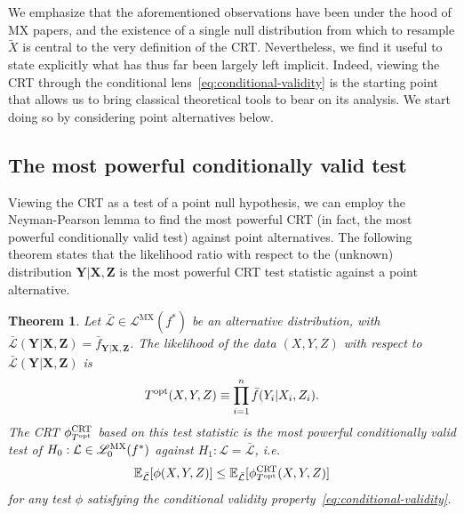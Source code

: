 \documentclass[12pt]{article}
\newtheorem{theorem}{Theorem}
\theoremstyle{definition}
\theoremstyle{remark}
\newcommand{\prx}{\bm X}
\newcommand{\srx}{X}
\newcommand{\prz}{\bm Z}
\newcommand{\srz}{Z}
\newcommand{\srxk}{\widetilde X}
\newcommand{\pry}{{\bm Y}}
\newcommand{\sry}{Y}
\def\CRT{\textnormal{CRT}}
\begin{document}
We emphasize that the aforementioned observations have been under the hood of MX papers, and the existence of a single null distribution from which to resample $\srxk$ is central to the very definition of the CRT. Nevertheless, we find it useful to state explicitly what has thus far been largely left implicit. Indeed, viewing the CRT through the conditional lens~\eqref{eq:conditional-validity} is the starting point that allows us to bring classical theoretical tools to bear on its analysis. We start doing so by considering point alternatives below.

\subsection{The most powerful conditionally valid test} \label{sec:NP}

Viewing the CRT as a test of a point null hypothesis, we can employ the  Neyman-Pearson lemma to find the most powerful CRT (in fact, the most powerful conditionally valid test) against point alternatives. The following theorem states that the likelihood ratio with respect to the (unknown) distribution $\pry|\prx, \prz$ is the most powerful CRT test statistic against a point alternative.

\begin{theorem} \label{prop:crt-optimality}
	Let $\bar{\mathcal L} \in \mathscr L^{\text{MX}}(f^*)$ be an alternative distribution, with $\bar{\mathcal L}(\pry|\prx,\prz) = \bar f_{\pry|\prx,\prz}$. The likelihood of the data $(\srx, \sry, \srz)$ with respect to $\bar{\mathcal L}(\pry|\prx,\prz)$ is
	\begin{equation}
	T^{\textnormal{opt}}(\srx, \sry, \srz) \equiv \prod_{i = 1}^n  \bar f(\sry_i|\srx_i, \srz_i).
	\label{log-likelihood-ratio}
	\end{equation}
	The CRT $\phi^{\CRT}_{T^{\textnormal{opt}}}$ based on this test statistic is the most powerful conditionally valid test of $H_0: \mathcal L \in \mathscr L_0^{\textnormal{MX}}(f^*)$ against $H_1: \mathcal L = \bar{\mathcal L}$, i.e. 
	\begin{equation}
	\mathbb E_{\bar{\mathcal L}}[\phi(\srx,\sry,\srz)] \leq \mathbb E_{\bar{\mathcal L}}[\phi^{\CRT}_{T^\textnormal{opt}}(\srx, \sry, \srz)]
	\label{unconditional}
	\end{equation}
	for any test $\phi$ satisfying the conditional validity property~\eqref{eq:conditional-validity}.
\end{theorem}
\end{document}
